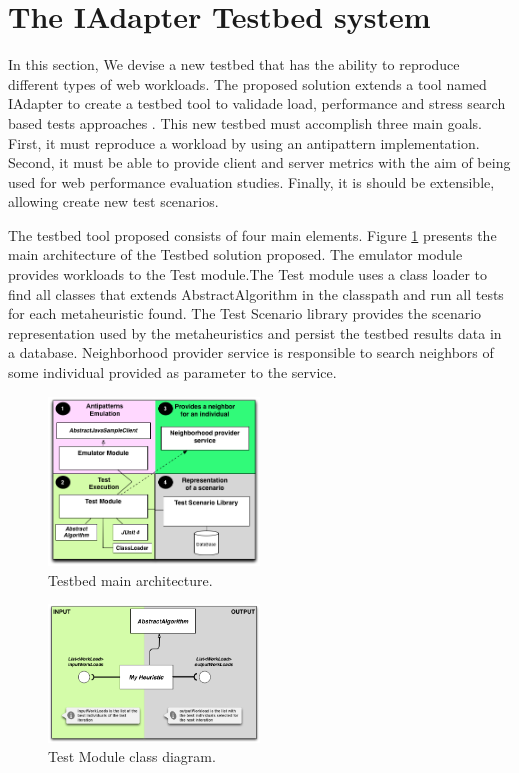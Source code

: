 
\vspace*{-.075in}
\section{The IAdapter Testbed system}\label{sec:technique}
\vspace*{-.075in}


In this section, We devise a new testbed that has the ability to reproduce different types of web workloads.  The proposed solution extends a tool named IAdapter to create a testbed tool to validade load, performance and stress search based tests approaches \cite{Gois2016}. This new testbed must accomplish three main goals. First, it must reproduce a workload by using an antipattern implementation. Second, it must be able to provide client and server metrics with the aim of being used for web performance evaluation studies. Finally, it is should be extensible, allowing create new test scenarios.

The testbed tool proposed consists of four main elements.  Figure \ref{fig:testbedarch} presents the main architecture of the Testbed solution proposed. The emulator module provides workloads to the Test module.The Test module uses a class loader to find all classes that extends AbstractAlgorithm in the classpath and run all tests for each metaheuristic found. The Test Scenario library provides the scenario representation used by the metaheuristics and persist the testbed results data in a database. Neighborhood provider service is responsible to search neighbors of some individual provided as parameter to the service.

\begin{figure}[h]
\centering
\includegraphics[width=0.5\textwidth]{./images/testbedarch.png}
\caption{Testbed main architecture.}
\label{fig:testbedarch}
\end{figure} 

\begin{figure}[h]
\centering
\includegraphics[width=0.5\textwidth]{./images/myheuristic.png}
\caption{Test Module class diagram.}
\label{fig:heuristicclassdiagram}
\end{figure} 



